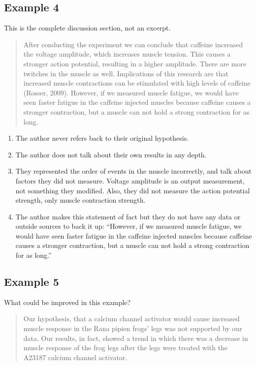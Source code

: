 \documentclass[
]{book}
\providecommand{\tightlist}{%
  \setlength{\itemsep}{0pt}\setlength{\parskip}{0pt}}
\begin{document}
\hypertarget{example-4-2}{%
\subsection{Example 4}\label{example-4-2}}

This is the complete discussion section, not an excerpt.

\begin{quote}
After conducting the experiment we can conclude that caffeine increased the voltage amplitude, which increases muscle tension. This causes a stronger action potential, resulting in a higher amplitude. There are more twitches in the muscle as well. Implications of this research are that increased muscle contractions can be stimulated with high levels of caffeine (Rosser, 2009). However, if we measured muscle fatigue, we would have seen faster fatigue in the caffeine injected muscles because caffeine causes a stronger contraction, but a muscle can not hold a strong contraction for as long.
\end{quote}

\begin{enumerate}
\def\labelenumi{\arabic{enumi}.}
\tightlist
\item
  The author never refers back to their original hypothesis.
\item
  The author does not talk about their own results in any depth.
\item
  They represented the order of events in the muscle incorrectly, and talk about factors they did not measure. Voltage amplitude is an output measurement, not something they modified. Also, they did not measure the action potential strength, only muscle contraction strength.
\item
  The author makes this statement of fact but they do not have any data or outside sources to back it up: ``However, if we measured muscle fatigue, we would have seen faster fatigue in the caffeine injected muscles because caffeine causes a stronger contraction, but a muscle can not hold a strong contraction for as long.''
\end{enumerate}

\hypertarget{example-5-1}{%
\subsection{Example 5}\label{example-5-1}}

What could be improved in this example?

\begin{quote}
Our hypothesis, that a calcium channel activator would cause increased muscle response in the Rana pipien frogs' legs was not supported by our data. Our results, in fact, showed a trend in which there was a decrease in muscle response of the frog legs after the legs were treated with the A23187 calcium channel activator.
\end{quote}
\end{document}
